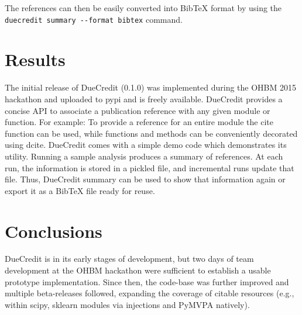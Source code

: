 \documentclass[twocolumn]{bmcart}%
\begin{document}
The references can then be easily converted into BibTeX format by using
the \texttt{duecredit\ summary\ -\/-format\ bibtex} command.

\section{Results}\label{results}

The initial release of DueCredit (0.1.0) was implemented during the OHBM
2015 hackathon and uploaded to pypi and is freely available. DueCredit
provides a concise API to associate a publication reference with any
given module or function. For example: To provide a reference for an
entire module the cite function can be used, while functions and methods
can be conveniently decorated using dcite. DueCredit comes with a simple
demo code which demonstrates its utility. Running a sample analysis
produces a summary of references. At each run, the information is stored
in a pickled file, and incremental runs update that file. Thus,
DueCredit summary can be used to show that information again or export
it as a BibTeX file ready for reuse.

\section{Conclusions}\label{conclusions}

DueCredit is in its early stages of development, but two days of team
development at the OHBM hackathon were sufficient to establish a usable
prototype implementation. Since then, the code-base was further improved
and multiple beta-releases followed, expanding the coverage of citable
resources (e.g., within scipy, sklearn modules via injections and PyMVPA
natively).

\end{document}
